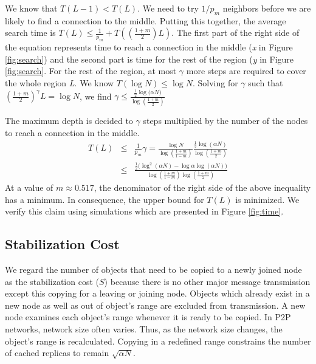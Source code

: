 \documentclass[conference]{IEEEtran}
\begin{document}
We know that $T(L-1) < T(L)$.  
We need to try $1/p_m$ neighbors before
we are likely to find a connection to the middle.  Putting this together,
the average search time is
$T(L) \leq \frac{1}{p_m} + T((\frac{1+m}{2})L)$. 
The first part of the right side of the equation represents time to reach 
a connection in the middle (\textit{x} in Figure \ref{fig:search}) and 
the second part is time for the rest of the region (\textit{y} in Figure \ref{fig:search}. 
For the rest of the region, at most $\gamma$ more steps are required to 
cover the whole region \textit{L}. We know $T(\log{N}) \leq \log N$. 
Solving for $\gamma$ such that $(\frac{1+m}{2})^{\gamma}L = \log N$, we
find $\gamma \leq \frac{\frac{1}{2}\log{(\alpha N})}{\log{(\frac{1+m}{2})}}$

The maximum depth is decided to $\gamma$ steps multiplied by the number of the nodes 
to reach a connection in the middle.
\begin{eqnarray*}
T(L) &\leq& \frac{1}{p_m}\gamma = \frac{\log N}{\log{(\frac{1+m}{1-m})}}\frac{\frac{1}{2}\log{(\alpha N)}}{\log{(\frac{1+m}{2})}}
 \\
     &\leq& \frac{\frac{1}{2}(\log^2 (\alpha N)-\log{\alpha}\log{(\alpha N))}}{\log{(\frac{1+m}{1-m})}\log{(\frac{1+m}{2})}}
\end{eqnarray*}
At a value of $m\approx0.517$, the denominator of the right side of the above inequality has a minimum. 
In consequence, the upper bound for $T(L)$ is minimized.
We verify this claim using simulations which are presented in Figure \ref{fig:time}. 

\subsection{Stabilization Cost}
\label{sec:stabilization_cost}
We regard the number of objects that need to be copied to 
a newly joined node as the stabilization cost ($S$) 
because there is no other major message transmission 
except this copying for a leaving or joining node. 
Objects which already exist in a new node as well as out of 
object's range are excluded from transmission.
A new node examines each object's range whenever it is ready to be copied.
In P2P networks, network size often varies. Thus, as the network
size changes, the object's range is recalculated.
Copying in a redefined range constrains the number of 
cached replicas to remain $\sqrt{\alpha N}$.
 
\end{document}
